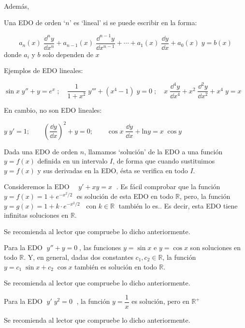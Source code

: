 Además,

\begin{defi}
Una EDO de orden `$n$' es `lineal' si se puede escribir en la forma:

\begin{equation}
	a_n(x)\; \dfrac {\dd^n y}{\dd x^n}+a_{n-1}(x)\; \dfrac {\dd^{n-1} y}{\dd x^{n-1}}+ \cdots + a_1(x)\;  \dfrac {\dd y}{\dd x}+a_0(x)\; y=b(x)
\end{equation}	
donde $a_i$ y $b$ solo dependen de $x$
\end{defi}

Ejemplos de EDO lineales:

$\sin x \; y''+y=e^x\; ; \quad \dfrac {1}{1+x^2}\; y'''+ (x^4-1)\; y=0\; ; \quad x\; \dfrac {\dd^4 y}{\dd x^4}+ x^2 \; \dfrac {\dd^2 y}{\dd x^2}+x^4\; y = x$

En cambio, no son EDO lineales:

$y\; y'=1;\qquad  \left( \dfrac{\dd y}{\dd x} \right)^2+y=0; \qquad \cos x\; \dfrac {\dd y}{\dd x}+\mathrm{ln} y=x\; \cos y$

\begin{defi}
Dada una EDO de orden $n$, llamamos `solución'	de la EDO a una función $y=f(x)$ definida en un intervalo $I$, de forma que cuando sustituimos $y=f(x)$ y sus derivadas en la EDO, ésta se verifica en todo $I$.
\end{defi}

\begin{ejem}
Consideremos la EDO $\quad y'+xy=x\; $	. Es fácil comprobar que la función $y=f(x)=1+e^{-{x^2}/2}\; $ es solución de esta EDO en todo $\mathbb R$, pero, la función $y=g(x)=1+k\cdot e^{-{x^2}/2}\; \; \text{ con } k\in \mathbb R \; $ también lo es.. Es decir, esta EDO tiene infinitas soluciones en $\mathbb R$.

Se recomienda al lector que compruebe lo dicho anteriormente.
\end{ejem}

\begin{ejem}
Para la EDO $\; y''+y=0\; $, las funciones $y=\sin x$ e $y=\cos x$ son soluciones en todo $\mathbb R$. Y, en general, dadas dos constantes $c_1, c_2 \in \mathbb R$, la función $y=c_1\; \sin x + c_2 \; \cos x$ también es solución en todo $\mathbb R$.

Se recomienda al lector que compruebe lo dicho anteriormente.
\end{ejem}

\begin{ejem}
Para la EDO $\; y'\; y^2=0 \;$	, la función $y=\dfrac 1 x$ es solución, pero en $\mathbb R^+$

Se recomienda al lector que compruebe lo dicho anteriormente.
\end{ejem}

